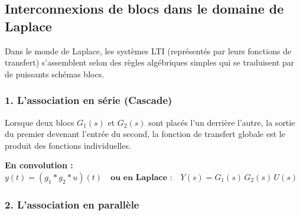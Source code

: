 \documentclass[11pt,a4paper]{report}
\begin{document}
\subsection{Interconnexions de blocs dans le domaine de Laplace}

Dans le monde de Laplace, les systèmes LTI (représentés par leurs fonctions de transfert) s'assemblent selon des règles algébriques simples qui se traduisent par de puissants schémas blocs.

\subsubsection{1. L'association en série (Cascade)}

Lorsque deux blocs $G_1(s)$ et $G_2(s)$ sont placés l'un derrière l'autre, la sortie du premier devenant l'entrée du second, la fonction de transfert globale est le produit des fonctions individuelles.

\medskip
\textbf{En convolution :} $y(t) = (g_1 * g_2 * u)(t) \quad \textbf{ou en Laplace :}\quad Y(s) = G_1(s)\,G_2(s)\,U(s)$

\begin{center}
\end{center}

\subsubsection{2. L'association en parallèle}
\end{document}

